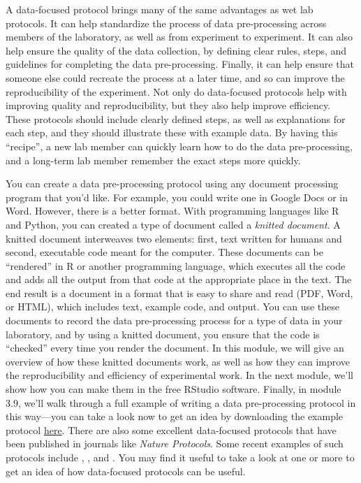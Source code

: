 \documentclass[]{tufte-book}
\begin{document}
A data-focused protocol brings many of the same advantages as wet lab protocols.
It can help standardize the process of data pre-processing across members of
the laboratory, as well as from experiment to experiment. It can also help
ensure the quality of the data collection, by defining clear rules,
steps, and guidelines for completing the data pre-processing. Finally, it can
help ensure that someone else could recreate the process at a later time, and
so can improve the reproducibility of the experiment.
Not only do data-focused protocols help with improving quality and reproducibility,
but they also help improve efficiency. These protocols should include
clearly defined steps, as well as explanations for each step, and they should illustrate
these with example data. By having this ``recipe'', a new lab member can quickly
learn how to do the data pre-processing, and a long-term lab member remember
the exact steps more quickly.

You can create a data pre-processing protocol using any document processing
program that you'd like. For example, you could write one in Google Docs or in
Word. However, there is a better format. With programming languages like R and
Python, you can created a type of document called a \emph{knitted document}. A
knitted document interweaves two elements: first, text written for humans and
second, executable code meant for the computer. These documents can be
``rendered'' in R or another programming language, which executes all the code and
adds all the output from that code at the appropriate place in the text. The end
result is a document in a format that is easy to share and read (PDF, Word, or
HTML), which includes text, example code, and output. You can use these
documents to record the data pre-processing process for a type of data in your
laboratory, and by using a knitted document, you ensure that the code is
``checked'' every time you render the document. In this module,
we will give an overview of how these knitted documents work, as well as how they
can improve the reproducibility and efficiency of experimental work. In the
next module, we'll show how you can make them in the free RStudio software.
Finally, in module 3.9, we'll walk through a full example of writing a data pre-processing
protocol in this way---you can take a look now to get an idea by downloading the
example protocol
\href{https://github.com/geanders/improve_repro/raw/master/data/bactcountr_example_data/example_protocol.pdf}{here}.
There are also some excellent data-focused protocols that have been published in
journals like \emph{Nature Protocols}. Some recent examples of such protocols include
\citet{schrode2021analysis}, \citet{quintelier2021analyzing}, and \citet{majumder2021cognitive}. You
may find it useful to take a look at one or more to get an idea of how
data-focused protocols can be useful.
\end{document}
